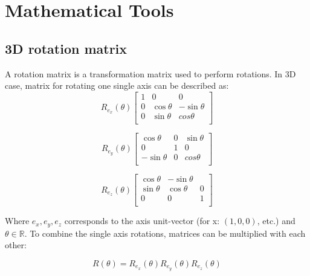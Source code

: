 

\chapter{Mathematical Tools}

\section{3D rotation matrix}
\label{app:3DrotationMatrix}
A rotation matrix is a transformation matrix used to perform rotations.
In 3D case, matrix for rotating one single axis can be described as:
\begin{equation}
    R_{e_x} (\theta)
    \begin{bmatrix}
        1 & 0 & 0\\
        0 & \cos \theta & - \sin \theta \\
        0 & \sin \theta & cos \theta \\
    \end{bmatrix}
\end{equation}

\begin{equation}
    R_{e_y} (\theta)
    \begin{bmatrix}
        \cos \theta & 0 & \sin \theta\\
        0 & 1 & 0 \\
        - \sin \theta & 0 & cos \theta \\
    \end{bmatrix}
\end{equation}

\begin{equation}
    R_{e_z} (\theta)
    \begin{bmatrix}
        \cos \theta & - \sin \theta\\
        \sin \theta & \cos \theta & 0 \\
        0 & 0 & 1 \\
    \end{bmatrix}
\end{equation}

Where $e_x, e_y, e_z$ corresponds to the axis unit-vector (for x: $(1,0,0)$, etc.) and $\theta \in \mathbb{R}$.
To combine the single axis rotations, matrices can be multiplied with each other:

\begin{equation}
    \label{eq:3d-rotation}
    R (\theta) = R_{e_x} (\theta) R_{e_y} (\theta) R_{e_z} (\theta)
\end{equation}

